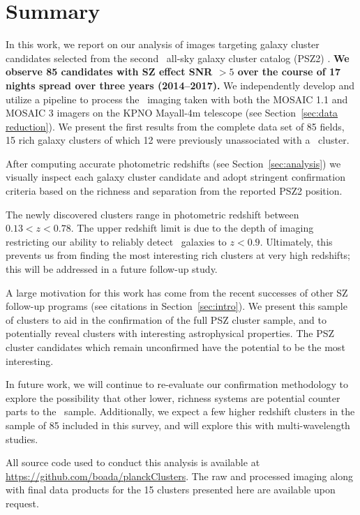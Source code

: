 \documentclass[apj, revtex4-1]{emulateapj}
\begin{document}
\section{Summary}\label{sec:summary}
In this work, we report on our analysis of images targeting galaxy cluster candidates selected from the second \planck\ all-sky galaxy cluster catalog (PSZ2) \citep{PlanckCollaboration2015a}. \textbf{We observe 85 candidates with SZ effect SNR $>5$ over the course of 17 nights spread over three years (2014--2017).} We independently develop and utilize a pipeline to process the \sdssg\sdssr\sdssi\sdssz\ imaging taken with both the MOSAIC 1.1 and MOSAIC 3 imagers on the KPNO Mayall-4m telescope (see Section~\ref{sec:data reduction}). We present the first results from the complete data set of 85 fields, 15 rich galaxy clusters of which 12 were previously unassociated with a \planck\ cluster.

After computing accurate photometric redshifts (see Section~\ref{sec:analysis}) we visually inspect each galaxy cluster candidate and adopt stringent confirmation criteria based on the richness and separation from the reported PSZ2 position.

The newly discovered clusters range in photometric redshift between $0.13 < z < 0.78$. The upper redshift limit is due to the depth of imaging restricting our ability to reliably detect \lstar\ galaxies to $z<0.9$. Ultimately, this prevents us from finding the most interesting rich clusters at very high redshifts; this will be addressed in a future follow-up study.

A large motivation for this work has come from the recent successes of other SZ follow-up programs (see citations in Section~\ref{sec:intro}). We present this sample of clusters to aid in the confirmation of the full PSZ cluster sample, and to potentially reveal clusters with interesting astrophysical properties. The PSZ cluster candidates which remain unconfirmed have the potential to be the most interesting.

In future work, we will continue to re-evaluate our confirmation methodology to explore the possibility that other lower, richness systems are potential counter parts to the \planck\ sample. Additionally, we expect a few higher redshift clusters in the sample of 85 included in this survey, and will explore this with multi-wavelength studies.

All source code used to conduct this analysis is available at \url{https://github.com/boada/planckClusters}. The raw and processed imaging along with final data products for the 15 clusters presented here are available upon request.
\end{document}
